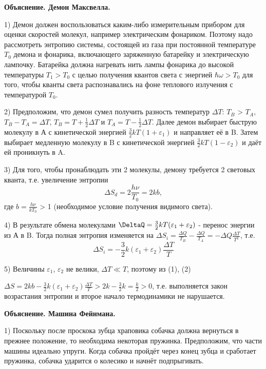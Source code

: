 \documentclass[a4paper, 12pt]{article}
\begin{document}
\newpage
\textbf{Объяснение. Демон Максвелла.}

1) Демон должен воспользоваться каким-либо измерительным прибором для оценки скоростей молекул, например электрическим фонариком. Поэтому надо рассмотреть энтропию системы, состоящей из газа при постоянной температуре $T_0$ демона и фонарика, включающего заряженную батарейку и электрическую лампочку. Батарейка должна нагревать нить лампы фонарика до высокой температуры $T_1 > T_0$ с целью получения квантов света с энергией $\hbar\omega > T_0$  для того, чтобы кванты света распознавались на фоне теплового излучения с температурой $T_0$.

2) Предположим, что демон сумел получить разность температур $\Delta T$:
$T_B$ > $T_A$, $T_B - T_A = \Delta T$, $T_B = T + \frac{1}{2} \Delta T$ и $T_A = T - \frac{1}{2} \Delta T$. Далее демон выбирает быструю молекулу в А с кинетической энергией $\frac{3}{2}kT(1+\varepsilon_1)$ и направляет её в B. Затем выбирает медленную молекулу в B с кинетической энергией  $\frac{3}{2}kT(1-\varepsilon_2)$ и даёт ей проникнуть в A.

3) Для того, чтобы пронаблюдать эти 2 молекулы, демону требуется 2 световых кванта, т.е. увеличение энтропии
\begin{equation}
 \Delta S_d = 2\frac{h\nu}{T_0} = 2kb,
 \label{eq:ref}
\end{equation}
где $b = \frac{h\nu}{kT_0}$ > 1 (необходимое условие получения видимого света).

4) В результате обмена молекулами $\DeltaQ = \frac{3}{2}kT(\varepsilon_1+\varepsilon_2)$ - перенос энергии из А в B. Тогда полная энтропия изменяется на $\Delta S_i = \frac{\Delta Q}{T_B} - \frac{\Delta Q}{T_A} = -\Delta Q \frac{\Delta T}{T^2}$, т.е.
\begin{equation}
 \Delta S_i = -\frac{3}{2}k(\varepsilon_1+\varepsilon_2)\frac{\Delta T}{T}
 \label{eq:ref}
\end{equation}

5) Величины $\varepsilon_1$, $\varepsilon_2$ не велики, $\Delta T \ll T$, поэтому из (1), (2)

$\Delta S = 2kb -\frac{3}{2}k(\varepsilon_1+\varepsilon_2)\frac{\Delta T}{T} > 2k - \frac{3}{2}k = \frac{k}{2} > 0$, т.е. выполняется закон возрастания энтропии и второе начало термодинамики не нарушается.\\

\newpage

\textbf {Объяснение. Машина Фейнмана.}

1) Поскольку после проскока зубца храповика собачка должна вернуться в прежнее положение, то необходима некоторая пружинка. Предположим, что части машины идеально упруги. Когда собачка пройдёт через конец зубца и сработает пружинка, собачка ударится о колесико и начнёт подпрыгивать.
\end{document}
